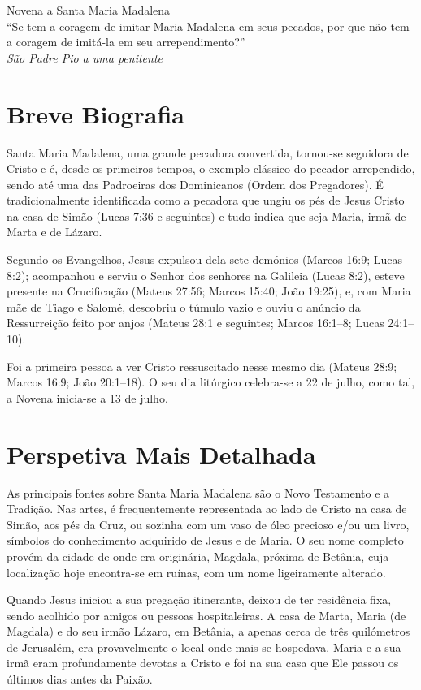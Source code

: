 \documentclass[a4paper,12pt]{extarticle}
\begin{document}
\begin{center}
  {\LARGE Novena a Santa Maria Madalena}\\[0.5em]
  “Se tem a coragem de imitar Maria Madalena em seus pecados, por que não tem a coragem de imitá-la em seu arrependimento?”\\
  \textit{São Padre Pio a uma penitente}
\end{center}

\tableofcontents
\thispagestyle{empty}

\newpage
\section{Breve Biografia}
Santa Maria Madalena, uma grande pecadora convertida, tornou-se seguidora de Cristo e é, desde os primeiros tempos, o exemplo clássico do pecador arrependido, sendo até uma das Padroeiras dos Dominicanos (Ordem dos Pregadores). É tradicionalmente identificada como a pecadora que ungiu os pés de Jesus Cristo na casa de Simão (Lucas 7:36 e seguintes) e tudo indica que seja Maria, irmã de Marta e de Lázaro.

Segundo os Evangelhos, Jesus expulsou dela sete demónios (Marcos 16:9; Lucas 8:2); acompanhou e serviu o Senhor dos senhores na Galileia (Lucas 8:2), esteve presente na Crucificação (Mateus 27:56; Marcos 15:40; João 19:25), e, com Maria mãe de Tiago e Salomé, descobriu o túmulo vazio e ouviu o anúncio da Ressurreição feito por anjos (Mateus 28:1 e seguintes; Marcos 16:1–8; Lucas 24:1–10).

Foi a primeira pessoa a ver Cristo ressuscitado nesse mesmo dia (Mateus 28:9; Marcos 16:9; João 20:1–18). O seu dia litúrgico celebra-se a 22 de julho, como tal, a Novena inicia-se a 13 de julho.

\section{Perspetiva Mais Detalhada}
As principais fontes sobre Santa Maria Madalena são o Novo Testamento e a Tradição. Nas artes, é frequentemente representada ao lado de Cristo na casa de Simão, aos pés da Cruz, ou sozinha com um vaso de óleo precioso e/ou um livro, símbolos do conhecimento adquirido de Jesus e de Maria. O seu nome completo provém da cidade de onde era originária, Magdala, próxima de Betânia, cuja localização hoje encontra-se em ruínas, com um nome ligeiramente alterado.

Quando Jesus iniciou a sua pregação itinerante, deixou de ter residência fixa, sendo acolhido por amigos ou pessoas hospitaleiras. A casa de Marta, Maria (de Magdala) e do seu irmão Lázaro, em Betânia, a apenas cerca de três quilómetros de Jerusalém, era provavelmente o local onde mais se hospedava. Maria e a sua irmã eram profundamente devotas a Cristo e foi na sua casa que Ele passou os últimos dias antes da Paixão.
\end{document}
